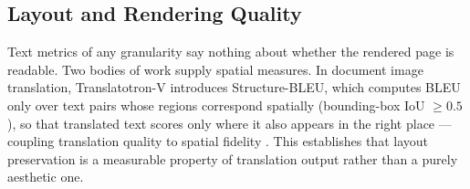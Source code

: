 \subsection{Layout and Rendering Quality}
\label{sec:background-layoutmetrics}

Text metrics of any granularity say nothing about whether the rendered
page is readable. Two bodies of work supply spatial measures. In
document image translation, Translatotron-V introduces
Structure-BLEU, which computes BLEU only over text pairs whose
regions correspond spatially (bounding-box IoU $\geq 0.5$), so that
translated text scores only where it also appears in the right
place --- coupling translation quality to spatial fidelity
\cite{lan2024translatotron}. This establishes
that layout preservation is a measurable property of translation
output rather than a purely aesthetic one.

